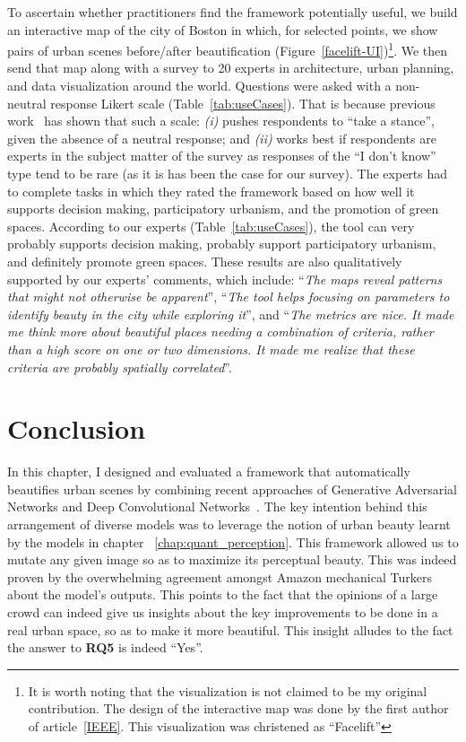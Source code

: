 To ascertain whether practitioners find the framework potentially useful, we build an interactive map of the city of Boston in which, for  selected points, we show pairs of urban scenes before/after beautification (Figure~\ref{facelift-UI})\footnote{It is worth noting that the visualization is not claimed to be my original contribution. The design of the interactive map was done by the first author of article~\ref{IEEE}. This visualization was christened as ``Facelift''}. We then send that map along with a survey to 20 experts in architecture, urban planning, and data visualization around the world. Questions were asked with a non-neutral response Likert scale (Table~\ref{tab:useCases}). That is because previous work~\cite{Agree2012,moors2008exploring} has shown that such a scale: \emph{(i)} pushes respondents to ``take a stance'', given the absence of a neutral response; and \emph{(ii)} works best if respondents are experts in the subject matter of the survey as responses of the ``I don't know'' type tend to be rare (as it is has been the case for our survey). The experts had to complete tasks in which they rated the framework based on how well it supports decision making, participatory urbanism, and the promotion of green spaces. According to our experts (Table~\ref{tab:useCases}), the tool can very probably supports decision making, probably support participatory urbanism, and definitely promote green spaces.  These results are  also qualitatively supported by our experts' comments, which include: ``\textit{The maps reveal patterns that might not otherwise be apparent}'',  ``\textit{The tool helps focusing on parameters to identify beauty in the city while exploring it}'',  and ``\textit{The metrics are nice. It made me think more about beautiful places needing a combination of criteria, rather than a high score on one or two dimensions. It made me realize that these criteria are probably spatially correlated}''.






\section{Conclusion}
\label{sec:discussion}

In this chapter, I designed and evaluated a framework that automatically beautifies urban scenes by combining recent approaches of Generative Adversarial Networks and Deep Convolutional Networks~\cite{dosovitskiy2015learning,dosovitskiy2016generating,dosovitskiy2016inverting}. The key intention behind this arrangement of diverse models was to leverage the notion of urban beauty learnt by the models in chapter ~\ref{chap:quant_perception}. This framework allowed us to mutate any given image so as to maximize its perceptual beauty. This was indeed proven by the overwhelming agreement amongst Amazon mechanical Turkers about the model's outputs. This points to the fact that the opinions of a large crowd can indeed give us insights about the key improvements to be done in a real urban space, so as to make it more beautiful. This insight alludes to the fact the answer to \textbf{RQ5} is indeed ``Yes''. 

